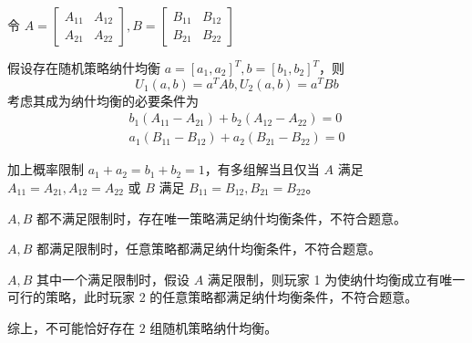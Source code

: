 \documentclass[12pt, a4paper, oneside]{ctexart}
\begin{document}
	令 $A=\begin{bmatrix}
		A_{11}& A_{12}\\A_{21}&A_{22}
	\end{bmatrix},B=\begin{bmatrix}
	B_{11}&B_{12}\\B_{21}&B_{22}
\end{bmatrix}$
	
	假设存在随机策略纳什均衡 $a=[a_1,a_2]^T,b=[b_1,b_2]^T$，则 
	$$
	U_1(a,b)=a^TAb,
	U_2(a,b)=a^TBb
	$$
	考虑其成为纳什均衡的必要条件为$$
	\begin{aligned}
		b_1(A_{11}-A_{21})+b_2(A_{12}-A_{22})=0\\
		a_1(B_{11}-B_{12})+a_2(B_{21}-B_{22})=0
	\end{aligned}
	$$
	
	加上概率限制 $a_1+a_2=b_1+b_2=1$，有多组解当且仅当 $A$ 满足 $A_{11}=A_{21},A_{12}=A_{22}$ 或 $B$ 满足 $B_{11}=B_{12},B_{21}=B_{22}$。
	
	$A,B$ 都不满足限制时，存在唯一策略满足纳什均衡条件，不符合题意。
	
	$A,B$ 都满足限制时，任意策略都满足纳什均衡条件，不符合题意。
	
	 $A,B$ 其中一个满足限制时，假设 $A$ 满足限制，则玩家 1 为使纳什均衡成立有唯一可行的策略，此时玩家 2 的任意策略都满足纳什均衡条件，不符合题意。
	 
	 综上，不可能恰好存在 $2$ 组随机策略纳什均衡。
	
\end{document}
